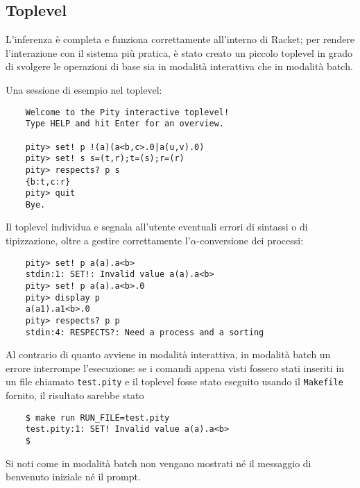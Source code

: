 \subsection{Toplevel}

L'inferenza \`e completa e funziona correttamente all'interno di Racket;
per rendere l'interazione con il sistema pi\`u pratica, \`e stato creato
un piccolo toplevel in grado di svolgere le operazioni di base sia in
modalit\`a interattiva che in modalit\`a batch.

Una sessione di esempio nel toplevel:

\begin{termlisting}
\begin{lstlisting}
    Welcome to the Pity interactive toplevel!
    Type HELP and hit Enter for an overview.

    pity> set! p !(a)(a<b,c>.0|a(u,v).0)
    pity> set! s s=(t,r);t=(s);r=(r)
    pity> respects? p s
    {b:t,c:r}
    pity> quit
    Bye.
\end{lstlisting}
\end{termlisting}

Il toplevel individua e segnala all'utente eventuali errori di sintassi
o di tipizzazione, oltre a gestire correttamente l'$\alpha$-conversione
dei processi:

\begin{termlisting}
\begin{lstlisting}
    pity> set! p a(a).a<b>
    stdin:1: SET!: Invalid value a(a).a<b>
    pity> set! p a(a).a<b>.0
    pity> display p
    a(a1).a1<b>.0
    pity> respects? p p
    stdin:4: RESPECTS?: Need a process and a sorting
\end{lstlisting}
\end{termlisting}

Al contrario di quanto avviene in modalit\`a interattiva, in modalit\`a
batch un errore interrompe l'esecuzione: se i comandi appena visti
fossero stati inseriti in un file chiamato \lstinline{test.pity} e il
toplevel fosse stato eseguito usando il \lstinline{Makefile} fornito,
il risultato sarebbe stato

\begin{termlisting}
\begin{lstlisting}
    $ make run RUN_FILE=test.pity
    test.pity:1: SET! Invalid value a(a).a<b>
    $ 
\end{lstlisting}
\end{termlisting}

Si noti come in modalit\`a batch non vengano mostrati n\'e il messaggio
di benvenuto iniziale n\'e il prompt.

